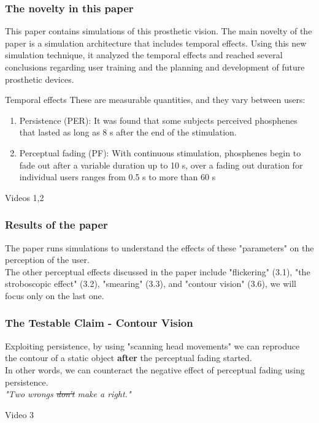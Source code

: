 \documentclass[]{beamer}
\theoremstyle{remark}
\begin{document}
\begin{frame}
\frametitle{The novelty in this paper}

This paper contains simulations of this prosthetic vision. The main novelty of the paper is a simulation architecture that includes \alert{temporal effects}. Using this new simulation technique, it analyzed the temporal effects and reached several conclusions regarding user training and the planning and development of future prosthetic devices.
\end{frame}



\begin{alertblock}{Temporal effects}
These are measurable quantities, and they vary between users:
\begin{enumerate}
	\item Persistence (PER): It was found that some subjects perceived phosphenes that lasted as long as 8 s after the end of the stimulation. 
	\item Perceptual fading (PF): With continuous stimulation, phosphenes begin to fade out after a variable duration up to 10 s, over a fading out
	duration for individual users ranges from 0.5 s to more than 60 s
	\end{enumerate}
\end{alertblock}

Videos 1,2
\begin{frame}
\frametitle{Results of the paper}

The paper runs simulations to understand the effects of these "parameters" on the perception of the user. \\

The other perceptual effects discussed in the paper include "flickering" (3.1), "the stroboscopic effect" (3.2), "smearing" (3.3), and "contour vision" (3.6), we will focus only on the last one.
\end{frame}

\begin{frame}
\frametitle{The Testable Claim - Contour Vision}
Exploiting persistence, by using "scanning head movements" we can reproduce the contour of a static object {\bf after} the perceptual fading started. \\
In other words, we can counteract the negative effect of perceptual fading using persistence. \\

{\it "Two wrongs \sout{don't} make a right."}

Video 3
\end{frame}
\end{document}
